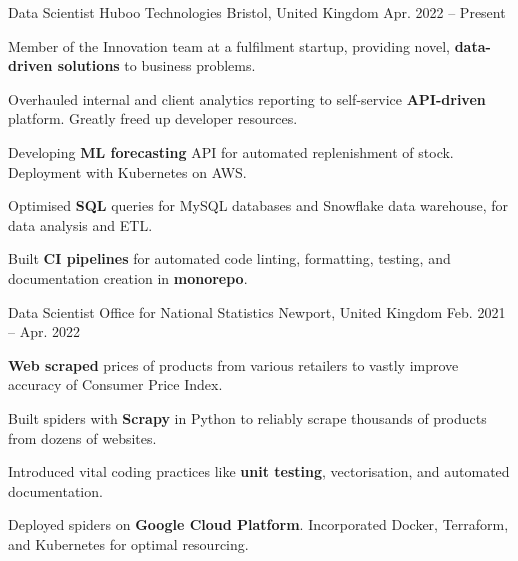 
\begin{cventries}

        \cventry
        {Data Scientist} %
        {Huboo Technologies} %
        {Bristol, United Kingdom} %
        {Apr. 2022 -- Present} %
        {
            \begin{cvitems} %
                \item{Member of the Innovation team at a fulfilment startup, providing novel, \textbf{data-driven solutions} to business problems.}
                \item{Overhauled internal and client analytics reporting to self-service \textbf{API-driven} platform. Greatly freed up developer resources.}
                \item{Developing \textbf{ML forecasting} API for automated replenishment of stock. Deployment with Kubernetes on AWS.}
                \item{Optimised \textbf{SQL} queries for MySQL databases and Snowflake data warehouse, for data analysis and ETL.}
                \item{Built \textbf{CI pipelines} for automated code linting, formatting, testing, and documentation creation in \textbf{monorepo}.}
            \end{cvitems}
        }

    \cventry
        {Data Scientist} %
        {Office for National Statistics} %
        {Newport, United Kingdom} %
        {Feb. 2021 -- Apr. 2022} %
        {
            \begin{cvitems} %
                \item{\textbf{Web scraped} prices of products from various retailers to vastly improve accuracy of Consumer Price Index.}
                \item{Built spiders with \textbf{Scrapy} in Python to reliably scrape thousands of products from dozens of websites.}
                \item{Introduced vital coding practices like \textbf{unit testing}, vectorisation, and automated documentation.}
                \item{Deployed spiders on \textbf{Google Cloud Platform}. Incorporated Docker, Terraform, and Kubernetes for optimal resourcing.}
            \end{cvitems}
        }


\end{cventries}
